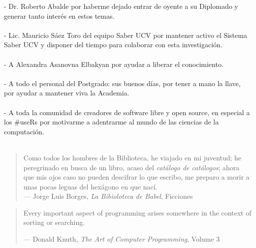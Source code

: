 - Dr. Roberto Abalde por haberme dejado entrar de oyente a su Diplomado y generar tanto interés en estos temas.\\\\
- Lic. Mauricio Sáez Toro del equipo Saber UCV por mantener activo el Sistema Saber UCV y disponer del tiempo para colaborar con esta investigación.\\\\
- A Alexandra Asanovna Elbakyan por ayudar a liberar el conocimiento.\\\\
- A todo el personal del Postgrado: sus buenos días, por tener a mano la llave, por ayudar a mantener viva la Academia.\\\\
- A toda la comunidad de creadores de software libre y open source, en especial a los \#useRs por motivarme a adentrarme al mundo de las ciencias de la computación.\\\\


\newpage
\thispagestyle{empty}
\vspace*{5cm}
\hfill
\begin{minipage}{0.70\textwidth}
\begin{quote}
Como todos los hombres de la Biblioteca, he viajado en mi juventud; he peregrinado en busca de un libro, acaso del \emph{catálogo de catálogos}; ahora que mis ojos caso no pueden descifrar lo que escribo, me preparo a morir a unas pocas leguas del hexágono en que nací.\\
--- Jorge Luis Borges, \textit{La Bibioloteca de Babel}, Ficciones
\end{quote}
\hspace*{2cm}

\begin{quote}
Every important aspect of programming arises somewhere in the context of sorting or searching.

--- Donald Knuth, \textit{The Art of Computer Programming}, Volume 3
\end{quote}
\end{minipage}

\thispagestyle{empty}
\maketitle


